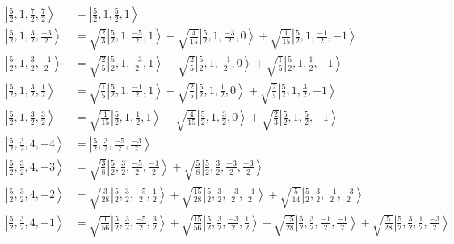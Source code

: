 \documentclass{report}
\newcommand{\ket}[1]{\left| #1 \right>} %
\begin{document}
\begin{align*}
\ket{ \frac{5}{2} ,  1 ,  \frac{7}{2} ,  \frac{7}{2}  } &=  \ket{ \frac{5}{2} ,  1 ,  \frac{5}{2} ,  1  } \\
\ket{ \frac{5}{2} ,  1 ,  \frac{3}{2} ,  \frac{-3}{2}  } &=  \sqrt{  \frac{2}{3}  } \ket{ \frac{5}{2} ,  1 ,  \frac{-5}{2} ,  1  } - \sqrt{  \frac{4}{15}  } \ket{ \frac{5}{2} ,  1 ,  \frac{-3}{2} ,  0  } + \sqrt{  \frac{1}{15}  } \ket{ \frac{5}{2} ,  1 ,  \frac{-1}{2} ,  -1  } \\
\ket{ \frac{5}{2} ,  1 ,  \frac{3}{2} ,  \frac{-1}{2}  } &=  \sqrt{  \frac{2}{5}  } \ket{ \frac{5}{2} ,  1 ,  \frac{-3}{2} ,  1  } - \sqrt{  \frac{2}{5}  } \ket{ \frac{5}{2} ,  1 ,  \frac{-1}{2} ,  0  } + \sqrt{  \frac{1}{5}  } \ket{ \frac{5}{2} ,  1 ,  \frac{1}{2} ,  -1  } \\
\ket{ \frac{5}{2} ,  1 ,  \frac{3}{2} ,  \frac{1}{2}  } &=  \sqrt{  \frac{1}{5}  } \ket{ \frac{5}{2} ,  1 ,  \frac{-1}{2} ,  1  } - \sqrt{  \frac{2}{5}  } \ket{ \frac{5}{2} ,  1 ,  \frac{1}{2} ,  0  } + \sqrt{  \frac{2}{5}  } \ket{ \frac{5}{2} ,  1 ,  \frac{3}{2} ,  -1  } \\
\ket{ \frac{5}{2} ,  1 ,  \frac{3}{2} ,  \frac{3}{2}  } &=  \sqrt{  \frac{1}{15}  } \ket{ \frac{5}{2} ,  1 ,  \frac{1}{2} ,  1  } - \sqrt{  \frac{4}{15}  } \ket{ \frac{5}{2} ,  1 ,  \frac{3}{2} ,  0  } + \sqrt{  \frac{2}{3}  } \ket{ \frac{5}{2} ,  1 ,  \frac{5}{2} ,  -1  } \\
\ket{ \frac{5}{2} ,  \frac{3}{2} ,  4 ,  -4  } &=  \ket{ \frac{5}{2} ,  \frac{3}{2} ,  \frac{-5}{2} ,  \frac{-3}{2}  } \\
\ket{ \frac{5}{2} ,  \frac{3}{2} ,  4 ,  -3  } &=  \sqrt{  \frac{3}{8}  } \ket{ \frac{5}{2} ,  \frac{3}{2} ,  \frac{-5}{2} ,  \frac{-1}{2}  } + \sqrt{  \frac{5}{8}  } \ket{ \frac{5}{2} ,  \frac{3}{2} ,  \frac{-3}{2} ,  \frac{-3}{2}  } \\
\ket{ \frac{5}{2} ,  \frac{3}{2} ,  4 ,  -2  } &=  \sqrt{  \frac{3}{28}  } \ket{ \frac{5}{2} ,  \frac{3}{2} ,  \frac{-5}{2} ,  \frac{1}{2}  } + \sqrt{  \frac{15}{28}  } \ket{ \frac{5}{2} ,  \frac{3}{2} ,  \frac{-3}{2} ,  \frac{-1}{2}  } + \sqrt{  \frac{5}{14}  } \ket{ \frac{5}{2} ,  \frac{3}{2} ,  \frac{-1}{2} ,  \frac{-3}{2}  } \\
\ket{ \frac{5}{2} ,  \frac{3}{2} ,  4 ,  -1  } &=  \sqrt{  \frac{1}{56}  } \ket{ \frac{5}{2} ,  \frac{3}{2} ,  \frac{-5}{2} ,  \frac{3}{2}  } + \sqrt{  \frac{15}{56}  } \ket{ \frac{5}{2} ,  \frac{3}{2} ,  \frac{-3}{2} ,  \frac{1}{2}  } + \sqrt{  \frac{15}{28}  } \ket{ \frac{5}{2} ,  \frac{3}{2} ,  \frac{-1}{2} ,  \frac{-1}{2}  } + \sqrt{  \frac{5}{28}  } \ket{ \frac{5}{2} ,  \frac{3}{2} ,  \frac{1}{2} ,  \frac{-3}{2}  } \\

\end{align*}
\end{document}
